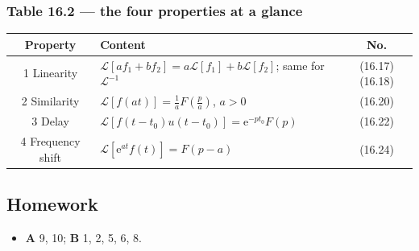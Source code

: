\documentclass[11pt,a4paper]{article}
\theoremstyle{definition}
\theoremstyle{plain}
\begin{document}
\subsubsection{Table 16.2 --- the four properties at a glance}

\begin{center}
\renewcommand{\arraystretch}{1.35}
\begin{tabular}{|c|l|c|}
\hline
Property & Content & No. \\ \hline
1 Linearity & $\mathcal{L}[af_1+bf_2]=a\mathcal{L}[f_1]+b\mathcal{L}[f_2]$; same for $\mathcal{L}^{-1}$ & (16.17)(16.18) \\ \hline
2 Similarity & $\mathcal{L}[f(at)]=\frac{1}{a}F\!\left(\frac{p}{a}\right)$, $a>0$ & (16.20) \\ \hline
3 Delay & $\mathcal{L}[f(t-t_0)u(t-t_0)]=\mathrm{e}^{-pt_0}F(p)$ & (16.22) \\ \hline
4 Frequency shift & $\mathcal{L}[\mathrm{e}^{at}f(t)]=F(p-a)$ & (16.24) \\ \hline
\end{tabular}
\end{center}

\clearpage
\subsection{Homework}

\begin{itemize}
    \item \textbf{A} 9, 10; \textbf{B} 1, 2, 5, 6, 8.
\end{itemize}
\end{document}
